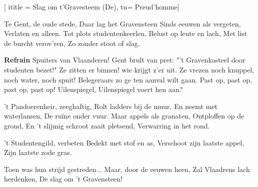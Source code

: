  [
ititle = {Slag om t'Gravesteem (De)},
tu= {Preud'homme}]


\beginverse
Te Gent, de oude stede,
Daar lag het Gravensteen
Sinds eeuwen als vergeten,
Verlaten en alleen.
Tot plots studentenkeerlen,
Belust op leute en lach,
Met list de burcht verov'ren,
Zo zonder stoot of slag.
\endverse

\beginchorus
\textbf {Refrain}
Spuiters van Vlaanderen!
Gent brult van pret:
"'t Gravenkasteel door studenten bezet!"
Ze zitten er binnen! wie krijgt z'er uit.
Ze vrezen noch knuppel, noch water, noch spuit!
Belegeraars zo ge ten aanval wilt gaan.
Past op, past op, past op, past op!
Uilenspiegel, Uilenspiegel voert hen aan?
\endchorus

\beginverse
't Pandoerenheir, zeeghaftig,
Rolt ladders bij de muur,
En neemt met waterlansen,
De ruïne onder vuur.
Maar appels als granaten,
Ontploffen op de grond,
En 't slijmig schroot zaait pletsend,
Verwarring in het rond.
\endverse

\beginverse
't Studentengild, verbeten
Bedekt met stof en as,
Verschoot zijn laatste appel,
Zijn laatste zode gras.
\endverse

\beginverse
Toen was hun strijd gestreden...
Maar, door de eeuwen heen,
Zal Vlaadrens lach herdenken,
De slag om 't Gravensteen!
\endverse

\endsong